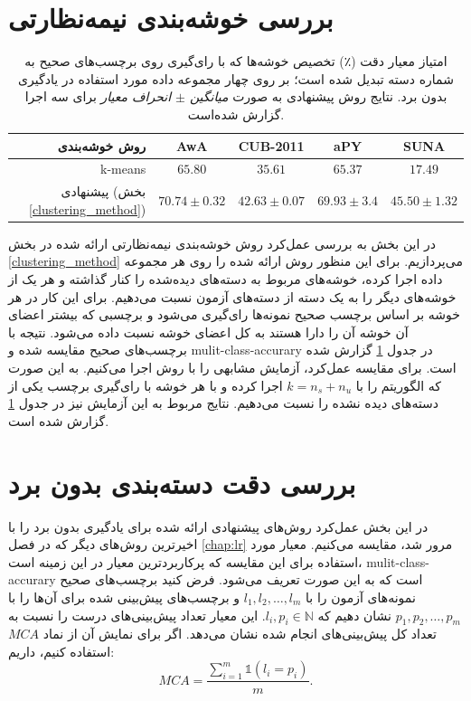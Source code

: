 \section{بررسی خوشه‌بندی نیمه‌نظارتی}\label{exp:cluster}
\begin{table}[ht]
\centering
\caption[بررسی عمل‌کرد خوشه‌بندی نیمه‌نظارتی پیشنهاتی]{
امتیاز معیار دقت (٪) تخصیص خوشه‌ها که با رای‌گیری روی برچسب‌های صحیح به شماره دسته تبدیل شده است؛ بر روی چهار مجموعه داده مورد استفاده در یادگیری بدون برد. نتایج روش پیشنهادی به صورت
\textit{ میانگین $\pm$ انحراف معیار }
برای سه اجرا گزارش شده‌است.}
\vspace*{2mm}
  \label{tab:clustering}
\begin{tabular}{|r|c|c|c|c|}
\hline
روش خوشه‌بندی & AwA & CUB-2011 & aPY & SUNA \\
\hline
k-means                             &  ${65.80}$                 & ${35.61}$           & ${65.37 }$               & ${17.49 }$   \\
\hline
پیشنهادی (بخش \ref{clustering_method})
                      & \textbf{${70.74\pm 0.32}$}  & \textbf{${42.63\pm 0.07}$} & \textbf{${69.93\pm 3.4}$} & \textbf{ ${45.50 \pm 1.32}$} \\
\hline
\end{tabular}
\vspace{2mm}
\end{table}

در این بخش به بررسی عمل‌کرد روش خوشه‌بندی نیمه‌نظارتی ارائه شده در بخش \ref{clustering_method} می‌پردازیم. برای این منظور روش ارائه شده را روی هر مجموعه داده اجرا کرده، خوشه‌های مربوط به دسته‌های دیده‌شده را کنار گذاشته  و هر یک از خوشه‌های دیگر را به یک دسته از دسته‌های آزمون نسبت می‌دهیم. برای این کار در هر خوشه بر اساس برچسب صحیح نمونه‌ها رای‌گیری می‌شود و برچسبی که بیشتر اعضای آن خوشه آن را دارا هستند به کل اعضای خوشه نسبت داده می‌شود. نتیجه با برچسب‌های صحیح مقایسه شده و \gls{mulit-class-accurary} در جدول \ref{tab:clustering} گزارش شده است.
 برای مقایسه عمل‌کرد، آزمایش مشابهی را با روش  اجرا می‌کنیم. به این صورت که  الگوریتم  را با $k=n_s + n_u$ اجرا کرده و با هر خوشه با رای‌گیری برچسب یکی از دسته‌های دیده نشده را نسبت می‌دهیم. نتایج مربوط به این آزمایش نیز در جدول \ref{tab:clustering} گزارش شده است.

\section{بررسی دقت دسته‌بندی بدون برد}\label{exp:comp}
در این بخش عمل‌کرد روش‌های پیشنهادی ارائه شده برای یادگیری بدون برد را با اخیرترین روش‌های دیگر که در فصل \ref{chap:lr} مرور شد، مقایسه می‌کنیم. معیار مورد استفاده برای این مقایسه که پرکاربردترین معیار در این زمینه است، \gls{mulit-class-accurary} است که به این صورت تعریف می‌شود. فرض کنید برچسب‌های صحیح نمونه‌های آزمون را با
$l_1, l_2, \ldots, l_m$
و  برچسب‌های پیش‌بینی شده برای آن‌ها را با
$p_1, p_2, \ldots, p_m$
نشان دهیم که
$l_i, p_i \in \mathbb{N}$.
این معیار تعداد پیش‌بینی‌های درست را نسبت به تعداد کل پیش‌بینی‌های انجام شده نشان می‌دهد. اگر برای نمایش آن از نماد $MCA$ استفاده کنیم، داریم:
\begin{equation}
MCA = \frac{\sum_{i=1}^m \mathds{1}(l_i = p_i)}{m}.
\end{equation}
